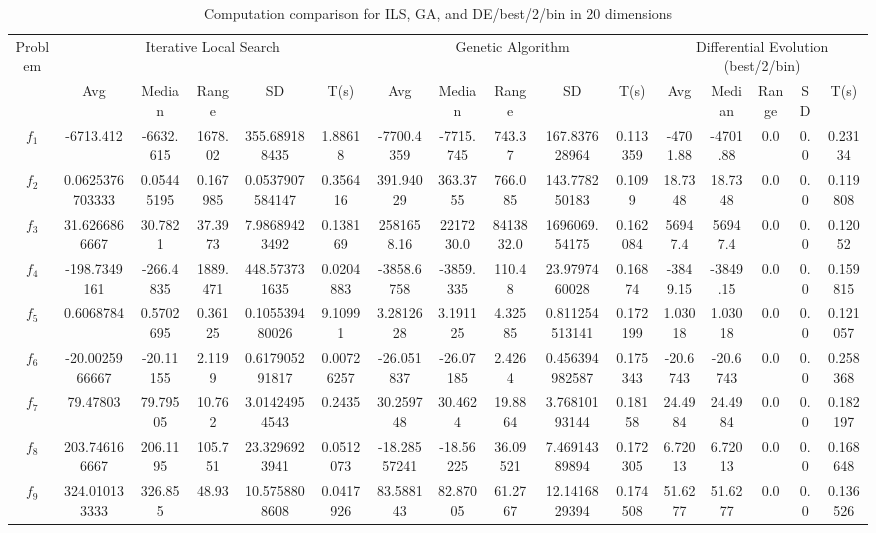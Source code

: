 \documentclass[paper=a4, fontsize=11pt]{scrartcl} %
\numberwithin{equation}{section} %
\numberwithin{figure}{section} %
\numberwithin{table}{section} %
\begin{document}
\begin{landscape}
	\begin{table}
		\tiny
		\centering
		\caption{Computation comparison for ILS, GA, and DE/best/2/bin in 20 dimensions}
		\label{Tab1d}
		\begin{tabular}{c|ccccc|ccccc|ccccc}
			\noalign{\smallskip}\hline\noalign{\smallskip}
			Problem & \multicolumn{5}{c}{Iterative Local Search}& \multicolumn{5}{|c|}{Genetic Algorithm}
			&  \multicolumn{5}{c}{Differential Evolution (best/2/bin)} \\ 
			\noalign{\smallskip}\hline\noalign{\smallskip}
			& Avg & Median & Range & SD & T(s) & Avg & Median
			& Range & SD & T(s) & Avg & Median & Range & SD &
			T(s) \\ 
			\noalign{\smallskip}\hline\noalign{\smallskip}
			$f_{1}$ & -6713.412 & -6632.615 & 1678.02 & 355.689188435 & 1.88618 & -7700.4359 & -7715.745 & 743.37 & 167.837628964 & 0.113359 & -4701.88 & -4701.88 & 0.0 & 0.0 & 0.23134\\
			$f_{2}$ & 0.0625376703333 & 0.05445195 & 0.167985 & 0.0537907584147 & 0.356416 & 391.94029 & 363.3755 & 766.085 & 143.778250183 & 0.1099 & 18.7348 & 18.7348 & 0.0 & 0.0 & 0.119808\\
			$f_{3}$ & 31.6266866667 & 30.7821 & 37.3973 & 7.98689423492 & 0.138169 & 2581658.16 & 2217230.0 & 8413832.0 & 1696069.54175 & 0.162084 & 56947.4 & 56947.4 & 0.0 & 0.0 & 0.12052\\
			$f_{4}$ & -198.7349161 & -266.4835 & 1889.471 & 448.573731635 & 0.0204883 & -3858.6758 & -3859.335 & 110.48 & 23.9797460028 & 0.16874 & -3849.15 & -3849.15 & 0.0 & 0.0 & 0.159815\\
			$f_{5}$ & 0.6068784 & 0.5702695 & 0.36125 & 0.105539480026 & 9.10991 & 3.2812628 & 3.191125 & 4.32585 & 0.811254513141 & 0.172199 & 1.03018 & 1.03018 & 0.0 & 0.0 & 0.121057\\
			$f_{6}$ & -20.0025966667 & -20.11155 & 2.1199 & 0.617905291817 & 0.00726257 & -26.051837 & -26.07185 & 2.4264 & 0.456394982587 & 0.175343 & -20.6743 & -20.6743 & 0.0 & 0.0 & 0.258368\\
			$f_{7}$ & 79.47803 & 79.79505 & 10.762 & 3.01424954543 & 0.2435 & 30.259748 & 30.4624 & 19.8864 & 3.76810193144 & 0.18158 & 24.4984 & 24.4984 & 0.0 & 0.0 & 0.182197\\
			$f_{8}$ & 203.746166667 & 206.1195 & 105.751 & 23.3296923941 & 0.0512073 & -18.28557241 & -18.56225 & 36.09521 & 7.46914389894 & 0.172305 & 6.72013 & 6.72013 & 0.0 & 0.0 & 0.168648\\
			$f_{9}$ & 324.010133333 & 326.855 & 48.93 & 10.5758808608 & 0.0417926 & 83.588143 & 82.87005 & 61.2767 & 12.1416829394 & 0.174508 & 51.6277 & 51.6277 & 0.0 & 0.0 & 0.136526\\

\end{tabular}
\end{table}
\end{landscape}
\end{document}
